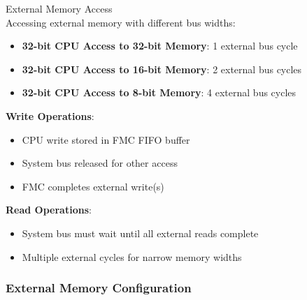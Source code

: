 \begin{concept}{External Memory Access}\\
Accessing external memory with different bus widths:
\begin{itemize}
    \item \textbf{32-bit CPU Access to 32-bit Memory}: 1 external bus cycle
    \item \textbf{32-bit CPU Access to 16-bit Memory}: 2 external bus cycles
    \item \textbf{32-bit CPU Access to 8-bit Memory}: 4 external bus cycles
\end{itemize}
\textbf{Write Operations}:
\begin{itemize}
    \item CPU write stored in FMC FIFO buffer
    \item System bus released for other access
    \item FMC completes external write(s)
\end{itemize}
\textbf{Read Operations}:
\begin{itemize}
    \item System bus must wait until all external reads complete
    \item Multiple external cycles for narrow memory widths
\end{itemize}
\end{concept}

\subsubsection{External Memory Configuration}

